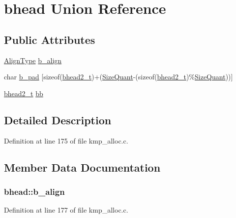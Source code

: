 \hypertarget{unionbhead}{\section{bhead Union Reference}
\label{unionbhead}
}
\subsection*{Public Attributes}
\begin{DoxyCompactItemize}
\item 
\hyperlink{kmp__alloc_8c_adaab326653e74716055fed800f3797e7}{Align\-Type} \hyperlink{unionbhead_a625600af39c889888813aeae7f0dd8e3}{b\-\_\-align}
\item 
char \hyperlink{unionbhead_aad3bcf2ab7e479e8e8c918f4659ba445}{b\-\_\-pad} \mbox{[}sizeof(\hyperlink{kmp__alloc_8c_a9651d02bd00b58901a4d1d9af7df824d}{bhead2\-\_\-t})+(\hyperlink{kmp__alloc_8c_a5c41333bbc87068897a3c879fa16fb85}{Size\-Quant}-\/(sizeof(\hyperlink{kmp__alloc_8c_a9651d02bd00b58901a4d1d9af7df824d}{bhead2\-\_\-t})\%\hyperlink{kmp__alloc_8c_a5c41333bbc87068897a3c879fa16fb85}{Size\-Quant}))\mbox{]}
\item 
\hyperlink{kmp__alloc_8c_a9651d02bd00b58901a4d1d9af7df824d}{bhead2\-\_\-t} \hyperlink{unionbhead_ab99fcbcc7514c17564d6e3fca349903a}{bb}
\end{DoxyCompactItemize}


\subsection{Detailed Description}


Definition at line 175 of file kmp\-\_\-alloc.\-c.



\subsection{Member Data Documentation}
\hypertarget{unionbhead_a625600af39c889888813aeae7f0dd8e3}{
\subsubsection[{b\-\_\-align}]{ bhead\-::b\-\_\-align}}\label{unionbhead_a625600af39c889888813aeae7f0dd8e3}


Definition at line 177 of file kmp\-\_\-alloc.\-c.

